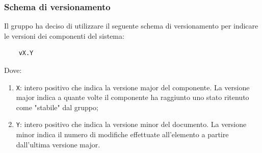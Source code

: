 \subsubsection{Schema di versionamento}
Il gruppo ha deciso di utilizzare il seguente schema di versionamento per indicare le versioni dei componenti del sistema:
\begin{lstlisting}
    vX.Y
\end{lstlisting}
Dove:
\begin{enumerate}
    \item \texttt{X}: intero positivo che indica la versione major del componente.
    La versione major indica a quante volte il componente ha raggiunto uno stato ritenuto come "stabile" dal gruppo;

    \item \texttt{Y}: intero positivo che indica la versione minor del documento.
    La versione minor indica il numero di modifiche effettuate all'elemento a partire dall'ultima versione major.
\end{enumerate}

